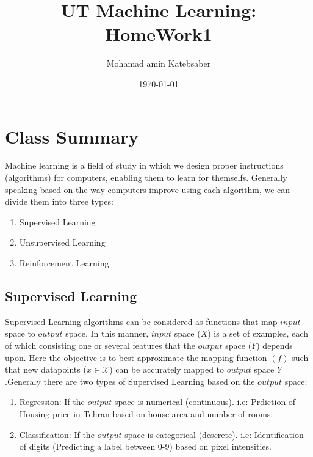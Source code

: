 \documentclass[12pt]{article}
\begin{document}
\title{UT Machine Learning: HomeWork1}
\author{Mohamad amin Katebsaber}
\date{\today}
\maketitle

\section{Class Summary}

Machine learning is a field of study in which we design proper instructions (algorithms) for computers, enabling them to learn for themselfs. Generally speaking based on the way computers improve using each algorithm, we can divide them into three types:

\begin{enumerate}
\item Supervised Learning 
\item Unsupervised Learning
\item Reinforcement Learning
\end{enumerate}

\subsection{Supervised Learning}
Supervised Learning algorithms can be considered as functions that map $input$ space to $output$ space. In this manner, $input$ space ($X$) is a set of examples, each of which consisting one or several features that the $output$ space ($Y$) depends upon. Here the objective is to best approximate the mapping function $(f)$ such that new datapoints ($x\in\mathcal{X}$) can be accurately mapped to $output$ space $Y$.Generaly there are two types of Supervised Learning based on the $output$ space:
\begin{enumerate}
\item Regression: If the $output$ space is numerical (continuous). i.e: Prdiction of Housing price in Tehran based on house area and number of rooms.
\item Classification: If the $output$ space is categorical (descrete). i.e: Identification of digits (Predicting a label between 0-9) based on pixel intensities.
\end{enumerate}
\end{document}

